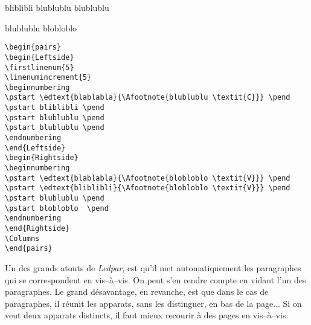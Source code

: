 \documentclass[a4paper,twoside,french,12pt]{book}
\begin{document}
\begin{pairs}
\begin{Leftside}
\beginnumbering
\pstart {} \pend
\pstart bliblibli \pend
\pstart blublublu \pend
\pstart blublublu \pend
\endnumbering
\end{Leftside}
\begin{Rightside}
\beginnumbering
\pstart {} \pend
\pstart {} \pend
\pstart blublublu \pend
\pstart blobloblo  \pend
\endnumbering
\end{Rightside}
\Columns
\end{pairs}

\begin{verbatim}
\begin{pairs}
\begin{Leftside}
\firstlinenum{5}
\linenumincrement{5}
\beginnumbering
\pstart \edtext{blablabla}{\Afootnote{blublublu \textit{C}}} \pend
\pstart bliblibli \pend
\pstart blublublu \pend
\pstart blublublu \pend
\endnumbering
\end{Leftside}
\begin{Rightside}
\beginnumbering
\pstart \edtext{blablabla}{\Afootnote{blobloblo \textit{V}}} \pend
\pstart \edtext{bliblibli}{\Afootnote{blobloblo \textit{V}}} \pend
\pstart blublublu \pend
\pstart blobloblo  \pend
\endnumbering
\end{Rightside}
\Columns
\end{pairs}
\end{verbatim}



Un des grands atouts de \textit{Ledpar}, est qu'il met automatiquement les paragraphes qui se correspondent en vis--à--vis. On peut s'en rendre compte en vidant l'un des paragraphes. Le grand désavantage, en revanche, est que dans le cas de paragraphes, il réunit les apparats, sans les distinguer, en bas de la page... Si on veut deux apparats distincts, il faut mieux recourir à des pages en vis--à--vis.
\end{document}
